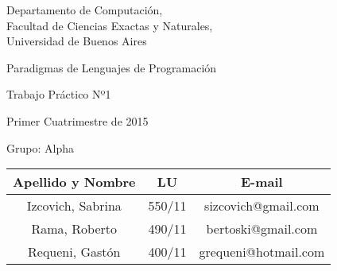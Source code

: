 \documentclass[10pt, a4paper]{article}
\author{Algoritmos y Estructuras de Datos III, DC, UBA.}
\date{}
\begin{document}
	
\thispagestyle{caratula}

\begin{center}

\vspace{2cm}

Departamento de Computación,\\
Facultad de Ciencias Exactas y Naturales,\\
Universidad de Buenos Aires

\vspace{4cm}

\begin{Huge}
Paradigmas de Lenguajes de Programación
\end{Huge}

\vspace{0.5cm}

\begin{huge}
Trabajo Práctico Nº1
\end{huge}

\vspace{1cm}

Primer Cuatrimestre de 2015

\vspace{4cm}


\begin{Large}
Grupo: Alpha
\end{Large}

\vspace{1cm}

\begin{tabular}{|c|c|c|}
\hline
Apellido y Nombre & LU & E-mail\\
\hline
Izcovich, Sabrina      & 550/11 & sizcovich@gmail.com\\
Rama, Roberto        & 490/11 & bertoski@gmail.com\\
Requeni, Gastón        & 400/11 & grequeni@hotmail.com\\
\hline
\end{tabular}

\end{center}

\newpage
\end{document}
